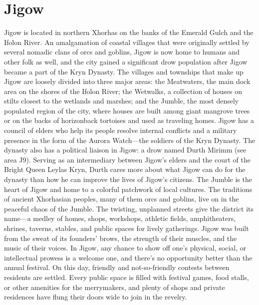 \documentclass[10pt,a4,twoside,twocolumn,openany,nodeprecatedcode]{dndbook}
\begin{document}
\section{Jigow}
Jigow is located in northern Xhorhas on the banks of the Emerald Gulch and the Ifolon River. An amalgamation of coastal villages that were originally settled by several nomadic clans of orcs and goblins, Jigow is now home to humans and other folk as well, and the city gained a significant drow population after Jigow became a part of the Kryn Dynasty.
The villages and townships that make up Jigow are loosely divided into three major areas: the Meatwaters, the main dock area on the shores of the Ifolon River; the Wetwalks, a collection of houses on stilts closest to the wetlands and marshes; and the Jumble, the most densely populated region of the city, where houses are built among giant mangrove trees or on the backs of horizonback tortoises and used as traveling homes.
Jigow has a council of elders who help its people resolve internal conflicts and a military presence in the form of the Aurora Watch—the soldiers of the Kryn Dynasty. The dynasty also has a political liaison in Jigow: a drow named Durth Mirimm (see area J9). Serving as an intermediary between Jigow's elders and the court of the Bright Queen Leylas Kryn, Durth cares more about what Jigow can do for the dynasty than how he can improve the lives of Jigow's citizens.
The Jumble is the heart of Jigow and home to a colorful patchwork of local cultures. The traditions of ancient Xhorhasian peoples, many of them orcs and goblins, live on in the peaceful chaos of the Jumble. The twisting, unplanned streets give the district its name—a medley of homes, shops, workshops, athletic fields, amphitheaters, shrines, taverns, stables, and public spaces for lively gatherings.
Jigow was built from the sweat of its founders' brows, the strength of their muscles, and the music of their voices. In Jigow, any chance to show off one's physical, social, or intellectual prowess is a welcome one, and there's no opportunity better than the annual festival. On this day, friendly and not-so-friendly contests between residents are settled. Every public space is filled with festival games, food stalls, or other amenities for the merrymakers, and plenty of shops and private residences have flung their doors wide to join in the revelry.
\end{document}
